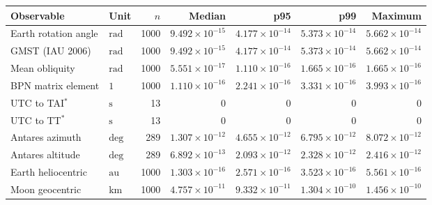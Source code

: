 \begin{tabular*}{\textwidth}{@{\extracolsep{\fill}}llrrrrr@{}}
\toprule
Observable & Unit & $n$ & Median & p95 & p99 & Maximum \\
\midrule
Earth rotation angle & $\mathrm{rad}$ & 1000 & $9.492\times10^{-15}$ & $4.177\times10^{-14}$ & $5.373\times10^{-14}$ & $5.662\times10^{-14}$ \\
GMST (IAU 2006) & $\mathrm{rad}$ & 1000 & $9.492\times10^{-15}$ & $4.177\times10^{-14}$ & $5.373\times10^{-14}$ & $5.662\times10^{-14}$ \\
Mean obliquity & $\mathrm{rad}$ & 1000 & $5.551\times10^{-17}$ & $1.110\times10^{-16}$ & $1.665\times10^{-16}$ & $1.665\times10^{-16}$ \\
BPN matrix element & $1$ & 1000 & $1.110\times10^{-16}$ & $2.241\times10^{-16}$ & $3.331\times10^{-16}$ & $3.993\times10^{-16}$ \\
UTC to TAI$^{*}$ & $\mathrm{s}$ & 13 & $0$ & $0$ & $0$ & $0$ \\
UTC to TT$^{*}$ & $\mathrm{s}$ & 13 & $0$ & $0$ & $0$ & $0$ \\
Antares azimuth & $\text{deg}$ & 289 & $1.307\times10^{-12}$ & $4.655\times10^{-12}$ & $6.795\times10^{-12}$ & $8.072\times10^{-12}$ \\
Antares altitude & $\text{deg}$ & 289 & $6.892\times10^{-13}$ & $2.093\times10^{-12}$ & $2.328\times10^{-12}$ & $2.416\times10^{-12}$ \\
Earth heliocentric & $\mathrm{au}$ & 1000 & $1.303\times10^{-16}$ & $2.571\times10^{-16}$ & $3.523\times10^{-16}$ & $5.561\times10^{-16}$ \\
Moon geocentric & $\mathrm{km}$ & 1000 & $4.757\times10^{-11}$ & $9.332\times10^{-11}$ & $1.304\times10^{-10}$ & $1.456\times10^{-10}$ \\
\bottomrule
\end{tabular*}
